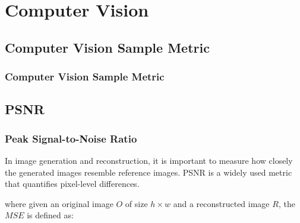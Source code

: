 \chapter{Computer Vision}


\clearpage
\thispagestyle{cvstyle}
\section{Computer Vision Sample Metric}
\subsection{Computer Vision Sample Metric}


\clearpage
\thispagestyle{cvstyle}
\section{PSNR}
\subsection{Peak Signal-to-Noise Ratio}

In image generation and reconstruction, it is important to measure how closely the generated images resemble reference images.
PSNR is a widely used metric that quantifies pixel-level differences.

\begin{center}
\end{center}

\vspace{-10pt} 

where given an original image $O$ of size $h \times w$ and a reconstructed image $R$, the $MSE$ is defined as:

\vspace{-10pt}

